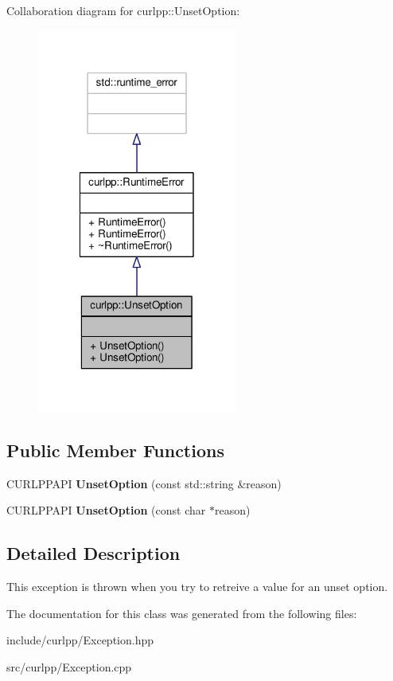 Collaboration diagram for curlpp\-:\-:Unset\-Option\-:
\nopagebreak
\begin{figure}[H]
\begin{center}
\leavevmode
\includegraphics[width=186pt]{classcurlpp_1_1UnsetOption__coll__graph}
\end{center}
\end{figure}
\subsection*{Public Member Functions}
\begin{DoxyCompactItemize}
\item 
\hypertarget{classcurlpp_1_1UnsetOption_a086177461e4721c8252c888078b50e18}{C\-U\-R\-L\-P\-P\-A\-P\-I {\bfseries Unset\-Option} (const std\-::string \&reason)}\label{classcurlpp_1_1UnsetOption_a086177461e4721c8252c888078b50e18}

\item 
\hypertarget{classcurlpp_1_1UnsetOption_a23a20072c9bd1442ad4ecf907694fbe5}{C\-U\-R\-L\-P\-P\-A\-P\-I {\bfseries Unset\-Option} (const char $\ast$reason)}\label{classcurlpp_1_1UnsetOption_a23a20072c9bd1442ad4ecf907694fbe5}

\end{DoxyCompactItemize}


\subsection{Detailed Description}
This exception is thrown when you try to retreive a value for an unset option. 

The documentation for this class was generated from the following files\-:\begin{DoxyCompactItemize}
\item 
include/curlpp/Exception.\-hpp\item 
src/curlpp/Exception.\-cpp\end{DoxyCompactItemize}
